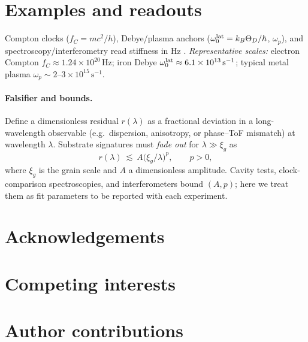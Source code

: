 \documentclass[11pt,oneside]{article}
\begin{document}
\section{Examples and readouts}
Compton clocks (\(f_C=mc^2/h\)), Debye/plasma anchors (\(\omega_0^{\rm lat}=k_B\Theta_D/\hbar\), \(\omega_p\)), and spectroscopy/interferometry read stiffness in Hz \cite{bipm2019si,callen1985thermodynamics,jackson1999classical}.
\textit{Representative scales:} electron Compton \(f_C \approx 1.24\times 10^{20}\,\mathrm{Hz}\);
iron Debye \(\omega_0^{\rm lat}\approx 6.1\times 10^{13}\,\mathrm{s^{-1}}\);
typical metal plasma \(\omega_p\sim 2\text{--}3\times 10^{15}\,\mathrm{s^{-1}}\).

\paragraph{Falsifier and bounds.}
Define a dimensionless residual \(r(\lambda)\) as a fractional deviation in a long-wavelength observable (e.g.\ dispersion, anisotropy, or phase--ToF mismatch) at wavelength \(\lambda\).
Substrate signatures must \emph{fade out} for \(\lambda\gg \xi_g\) as
\[
r(\lambda)\ \lesssim\ A\big(\xi_g/\lambda\big)^{p},\qquad p>0,
\]
where \(\xi_g\) is the grain scale and \(A\) a dimensionless amplitude.
Cavity tests, clock-comparison spectroscopies, and interferometers bound \((A,p)\); here we treat them as fit parameters to be reported with each experiment.


\clearpage
\section*{Acknowledgements}

\section*{Competing interests}

\section*{Author contributions}
\end{document}
